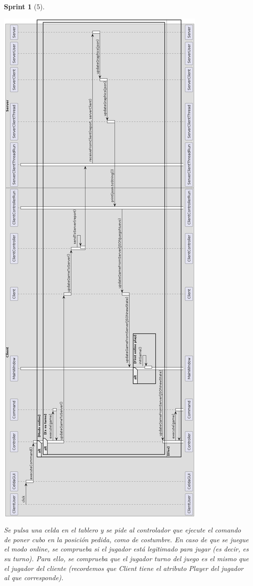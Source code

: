 \documentclass{article}
\theoremstyle{break}
\newtheorem*{sprint}{Sprint}
\begin{document}
\begin{sprint}[5]
\begin{center}
\includegraphics[scale=0.4]{juegoTipicoUml.png}
\end{center}

Se pulsa una celda en el tablero y se pide al controlador que ejecute el comando de poner cubo en la posición pedida, como de costumbre. En caso de que se juegue el modo online, se comprueba si el jugador está legitimado para jugar (es decir, es su turno). Para ello, se comprueba que el jugador turno del juego es el mismo que el jugador del cliente (recordemos que Client tiene el atributo Player del jugador al que corresponde).


\end{sprint}
\end{document}
